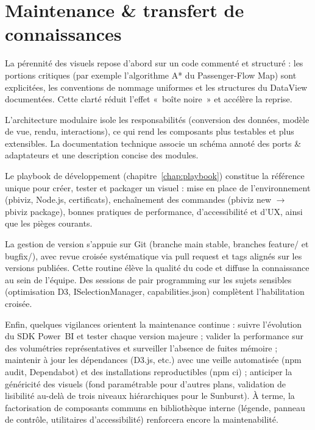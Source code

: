 
\section{Maintenance \& transfert de connaissances}
\label{sec:maintenance}

La pérennité des visuels repose d’abord sur un code commenté et structuré : les portions critiques (par exemple l’algorithme A* du Passenger-Flow Map) sont explicitées, les conventions de nommage uniformes et les structures du DataView documentées. Cette clarté réduit l’effet «~boîte noire~» et accélère la reprise.

L’architecture modulaire isole les responsabilités (conversion des données, modèle de vue, rendu, interactions), ce qui rend les composants plus testables et plus extensibles. La documentation technique associe un schéma annoté des ports \& adaptateurs et une description concise des modules.

Le playbook de développement (chapitre~\ref{chap:playbook}) constitue la référence unique pour créer, tester et packager un visuel : mise en place de l’environnement (pbiviz, Node.js, certificats), enchaînement des commandes (pbiviz new \(\rightarrow\) pbiviz package), bonnes pratiques de performance, d’accessibilité et d’UX, ainsi que les pièges courants.

La gestion de version s’appuie sur Git (branche main stable, branches feature/ et bugfix/), avec revue croisée systématique via pull request et tags alignés sur les versions publiées. Cette routine élève la qualité du code et diffuse la connaissance au sein de l’équipe. Des sessions de pair programming sur les sujets sensibles (optimisation D3, ISelectionManager, capabilities.json) complètent l’habilitation croisée.

Enfin, quelques vigilances orientent la maintenance continue : suivre l’évolution du SDK Power~BI et tester chaque version majeure ; valider la performance sur des volumétries représentatives et surveiller l’absence de fuites mémoire ; maintenir à jour les dépendances (D3.js, etc.) avec une veille automatisée (npm audit, Dependabot) et des installations reproductibles (npm ci) ; anticiper la généricité des visuels (fond paramétrable pour d’autres plans, validation de lisibilité au-delà de trois niveaux hiérarchiques pour le Sunburst). À terme, la factorisation de composants communs en bibliothèque interne (légende, panneau de contrôle, utilitaires d’accessibilité) renforcera encore la maintenabilité.
